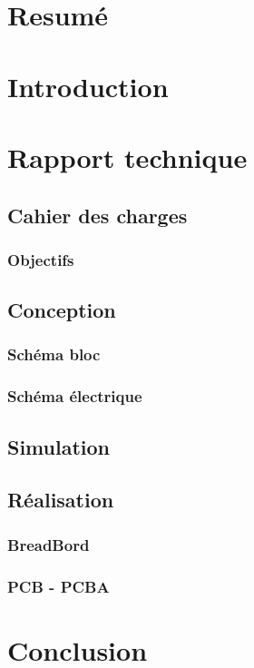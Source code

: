\documentclass[12pt]{article}
\begin{document}
\section{Resumé} %

\section{Introduction}%

\section{Rapport technique}%
    \subsection{Cahier des charges}
        \subsubsection{Objectifs}
    \subsection{Conception}
        \subsubsection{Schéma bloc}
        \subsubsection{Schéma électrique}
    \subsection{Simulation}
    \subsection{Réalisation}
        \subsubsection{BreadBord}
        \subsubsection{PCB - PCBA}

\section{Conclusion}%

\newpage


\end{document}
